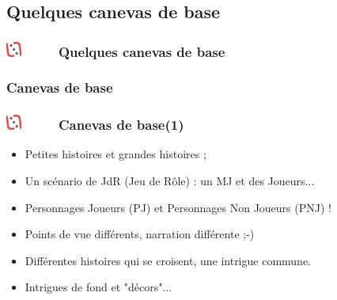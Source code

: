 \documentclass[slidetop,11pt]{beamer}
\def\moreInFrameTitleLeftt{\includegraphics[height=0.5cm]{img/ligueludique-0.png}~~~~~}
\begin{document}
\def\sectionPartIIa{Quelques canevas de base}
\subsection{\sectionPartIIa}
\begin{frame}
	\frametitle{\moreInFrameTitleLeftt \sectionPartIIa }
	\tableofcontents[sections=2,currentsection,subsectionstyle=show/shaded/hide]
\end{frame} 

\def\sectionPartIIaII{Canevas de base}
\subsubsection{\sectionPartIIaII}
\begin{frame}
	\frametitle{\moreInFrameTitleLeftt \sectionPartIIaII  (1)}
	\begin{itemize}
		\item Petites histoires et grandes histoires ; 
		\item Un sc{\'e}nario de JdR (Jeu de R{\^o}le) : un MJ et des Joueurs... 
		\item Personnages Joueurs (PJ) et Personnages Non Joueurs (PNJ) !
		\item Points de vue diff{\'e}rents, narration diff{\'e}rente ;-)
		\item Diff{\'e}rentes histoires qui se croisent, une intrigue commune. 
		\item Intrigues de fond et "d{\'e}cors"...
	\end{itemize}
\end{frame} 

			
\end{document}
